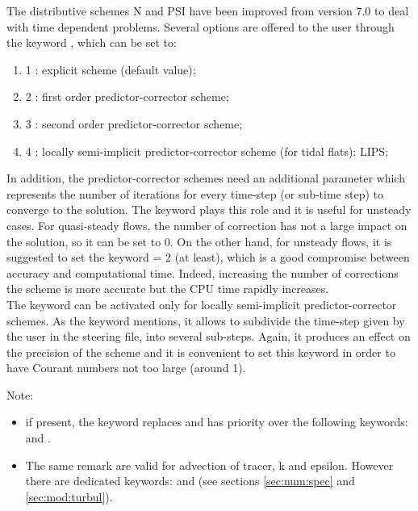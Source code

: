 The distributive schemes N and PSI have been improved from version 7.0 to deal with time dependent problems. Several options are offered to the user through
the keyword , which can be set to:
\begin{enumerate}
\item[\nonumber] 1 : explicit scheme (default value);
\item[\nonumber] 2 : first order predictor-corrector scheme;
\item[\nonumber] 3 : second order predictor-corrector scheme;
\item[\nonumber] 4 : locally semi-implicit predictor-corrector scheme (for tidal flats): LIPS;
\end{enumerate}
In addition, the predictor-corrector schemes need an additional parameter which represents the number of iterations for every time-step (or sub-time step) to converge to the solution.
The keyword  plays this role and it is useful for unsteady cases. For quasi-steady flows, the number of correction has not a large impact on the solution, so it can be set to 0. On the other hand, for unsteady flows, it is suggested to set the keyword = 2 (at least), which is a good compromise between accuracy and computational time.
Indeed, increasing the number of corrections the scheme is more accurate but the CPU time rapidly increases.\\
The keyword  can be activated only for locally semi-implicit predictor-corrector schemes. As the keyword mentions, it allows to
subdivide the time-step given by the user in the steering file, into several sub-steps. Again, it produces an effect on the precision of the scheme and it is convenient to set this keyword in order to have Courant numbers not too large (around 1).

\begin{WarningBlock}{Note:}
\begin{itemize}

\item  if present, the keyword  replaces and has priority over the following keywords:  and .

\item  The same remark are valid for advection of tracer, k and epsilon. However there are dedicated keywords: and  (see sections \ref{sec:num:spec} and \ref{sec:mod:turbul}).
\end{itemize}
\end{WarningBlock}

